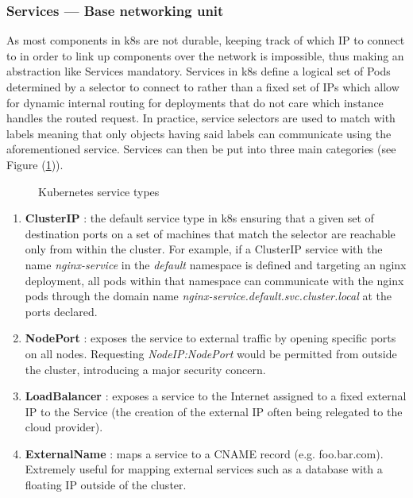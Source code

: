 \documentclass[11pt]{article}
\begin{document}
\subsubsection{Services — Base networking unit}

\hspace{5mm} As most components in k8s are not durable, keeping track of which IP to connect to in order to link up components over the network is impossible, thus making an abstraction like Services mandatory. Services in k8s define a logical set of Pods determined by a selector to connect to rather than a fixed set of IPs which allow for dynamic internal routing for deployments that do not care which instance handles the routed request. In practice, service selectors are used to match with labels meaning that only objects having said labels can communicate using the aforementioned service. Services can then be put into three main categories (see Figure (\ref{fig:k8s_service_type})).
    
    \begin{figure}[h]
        \centering
        \hspace{2mm}
        \hspace{2mm}

        \caption{Kubernetes service types}
        \label{fig:k8s_service_type}
    \end{figure}
    
    \vspace{3mm}
    \begin{enumerate}
        \item \textbf{ClusterIP} : the default service type in k8s ensuring that a given set of destination ports on a set of machines that match the selector are reachable only from within the cluster. For example, if a ClusterIP service with the name \textit{nginx-service} in the \textit{default} namespace is defined and targeting an nginx deployment, all pods within that namespace can communicate with the nginx pods through the domain name \textit{nginx-service.default.svc.cluster.local} at the ports declared. 
        
        \item \textbf{NodePort} : exposes the service to external traffic by opening specific ports on all nodes. Requesting \textit{NodeIP:NodePort} would be permitted from outside the cluster, introducing a major security concern.
        
        \item \textbf{LoadBalancer} : exposes a service to the Internet assigned to a fixed external IP to the Service (the creation of the external IP often being relegated to the cloud provider). 
        
        \item \textbf{ExternalName} : maps a service to a CNAME record (e.g. foo.bar.com). Extremely useful for mapping external services such as a database with a floating IP outside of the cluster. 
    \end{enumerate}
\end{document}
